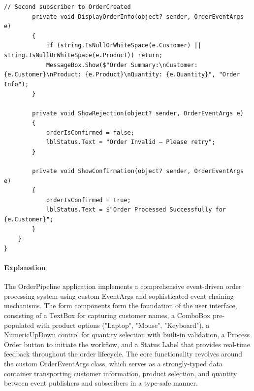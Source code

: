 \begin{lstlisting}[language=CSharp, caption={Complete Order Pipeline Implementation}]
        // Second subscriber to OrderCreated
        private void DisplayOrderInfo(object? sender, OrderEventArgs e)
        {
            if (string.IsNullOrWhiteSpace(e.Customer) || string.IsNullOrWhiteSpace(e.Product)) return;
            MessageBox.Show($"Order Summary:\nCustomer: {e.Customer}\nProduct: {e.Product}\nQuantity: {e.Quantity}", "Order Info");
        }

        private void ShowRejection(object? sender, OrderEventArgs e)
        {
            orderIsConfirmed = false;
            lblStatus.Text = "Order Invalid – Please retry";
        }

        private void ShowConfirmation(object? sender, OrderEventArgs e)
        {
            orderIsConfirmed = true;
            lblStatus.Text = $"Order Processed Successfully for {e.Customer}";
        }
    }
}
\end{lstlisting}

\paragraph{Explanation}

The OrderPipeline application implements a comprehensive event-driven order processing system using custom EventArgs and sophisticated event chaining mechanisms. The form components form the foundation of the user interface, consisting of a TextBox for capturing customer names, a ComboBox pre-populated with product options ("Laptop", "Mouse", "Keyboard"), a NumericUpDown control for quantity selection with built-in validation, a Process Order button to initiate the workflow, and a Status Label that provides real-time feedback throughout the order lifecycle. The core functionality revolves around the custom OrderEventArgs class, which serves as a strongly-typed data container transporting customer information, product selection, and quantity between event publishers and subscribers in a type-safe manner.

